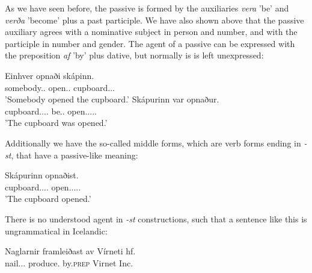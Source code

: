 \documentclass[12pt,%
    times,
]{lin-v2/lin}
\begin{document}
As we have seen before, the passive is formed by the auxiliaries \emph{vera} 'be' and \emph{verða} 'become' plus a past participle.
We have also shown above that the passive auxiliary agrees with a nominative subject in person and number, and with the participle in
number and gender. The agent of a passive can be expressed with the preposition \emph{af} 'by' plus dative, but normally is is left
unexpressed:
\begin{exe}
    \ex
    \gll Einhver opnaði skápinn.\\
    somebody.\Third\Nom.\Sg{} open.\Third\Sg.\Pst{} cupboard.\Acc.\Sg.\Det\\
    \trans 'Somebody opened the cupboard.'
    \ex
    \gll Skápurinn var opnaður.\\
    cupboard.\Nom.\Sg.\M.\Det{} be.\Third\Sg.\Pst{} open.\Nom.\Sg.\M.\Pst.\Ptcp\\
    \trans 'The cupboard was opened.'
\end{exe}

Additionally we have the so-called middle forms, which are verb forms ending in \emph{-st}, that have a passive-like meaning:
\begin{exe}
    \ex
    \gll Skápurinn opnaðist.\\
    cupboard.\Nom.\Sg.\M.\Det{} open.\Nom.\Sg.\M.\Pst.\Ptcp\\
    \trans 'The cupboard opened.'
\end{exe}

There is no understood agent in \emph{-st} constructions, such that a sentence like this is ungrammatical in Icelandic:
\begin{exe}
    \ex
    \gll *Naglarnir framleiðast av Vírneti hf.\\
    nail.\Nom.\Sg.\Det{} produce.\Sg{} by.\textsc{prep} Virnet Inc.\\
\end{exe}
\end{document}
